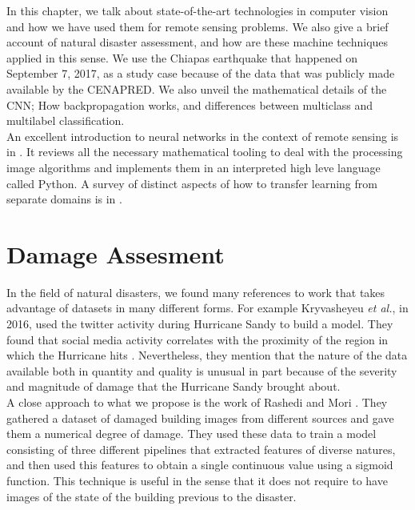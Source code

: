 In this chapter, we talk about state-of-the-art technologies in computer vision and how we have used them for remote sensing problems. We also give a brief account of natural disaster assessment, and how are these machine techniques applied in this sense. We use the Chiapas earthquake that happened on September 7, 2017, as a study case because of the data that was publicly made available by the CENAPRED. We also unveil the mathematical details of the CNN; How backpropagation works, and differences between multiclass and multilabel classification.\\

An excellent introduction to neural networks in the context of remote sensing is in \cite{canty2014image}. It reviews all the necessary mathematical tooling to deal with the processing image algorithms and implements them in an interpreted high leve language called Python. A survey of distinct aspects of how to transfer learning from separate domains is in \cite{5288526}.\\

\section{Damage Assesment}

In the field of natural disasters, we found many references to work that takes advantage of datasets in many different forms. For example Kryvasheyeu \textit{et al.}, in 2016, used the twitter activity during  Hurricane Sandy to build a model. They found that social media activity correlates with the proximity of the region in which the Hurricane hits \cite{Kryvasheyeue1500779}. Nevertheless, they mention that the nature of the data available both in quantity and quality is unusual in part because of the severity and magnitude of damage that the Hurricane Sandy brought about.\\

A close approach to what we propose is the work of Rashedi and Mori \cite{Nia2017BuildingDA}. They gathered a dataset of damaged building images from different sources and gave them a numerical degree of damage. They used these data to train a model consisting of three different pipelines that extracted features of diverse natures, and then used this features to obtain a single continuous value using a sigmoid function. This technique is useful in the sense that it does not require to have images of the state of the building previous to the disaster.\\


